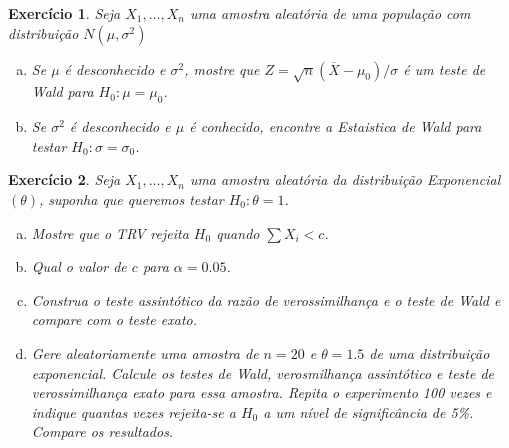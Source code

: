 \documentclass[letter,11pt]{article}
\newtheorem{exer}{Exercício}
\begin{document}
\begin{exer} \rm
Seja $X_1, \ldots, X_n$ uma amostra aleatória de uma população com distribuição $N(\mu, \sigma^2)$

\begin{enumerate}[a)]

\item Se $\mu$ é desconhecido e $\sigma^2$, mostre que $Z=\sqrt{n}(\overline{X}-\mu_0)/\sigma$ é um teste de Wald para $H_0:\mu=\mu_0$.

\item Se $\sigma^2$ é desconhecido e $\mu$ é conhecido, encontre a Estaistica de Wald para testar $H_0:\sigma=\sigma_0$.
\end{enumerate}
\end{exer}


\begin{exer} \rm
Seja $X_1, \ldots, X_n$ uma amostra aleatória da distribuição Exponencial $(\theta)$, suponha que queremos testar $H_0:\theta=1$.

\begin{enumerate}[a)]

\item Mostre que o TRV rejeita $H_0$ quando $\sum X_i<c$. 

\item Qual o valor de $c$ para $\alpha=0.05$.

\item Construa o teste assintótico da razão de verossimilhança e o teste de Wald e compare com o teste exato.

\item Gere aleatoriamente uma amostra de $n=20$ e $\theta=1.5$ de uma distribuição exponencial. Calcule os testes de Wald, verosmilhança assintótico e teste de verossimilhança exato para essa amostra. Repita o experimento 100 vezes e indique quantas vezes rejeita-se a $H_0$ a um nível de significância de 5\%. Compare os resultados.

\end{enumerate}
\end{exer}
\end{document}
